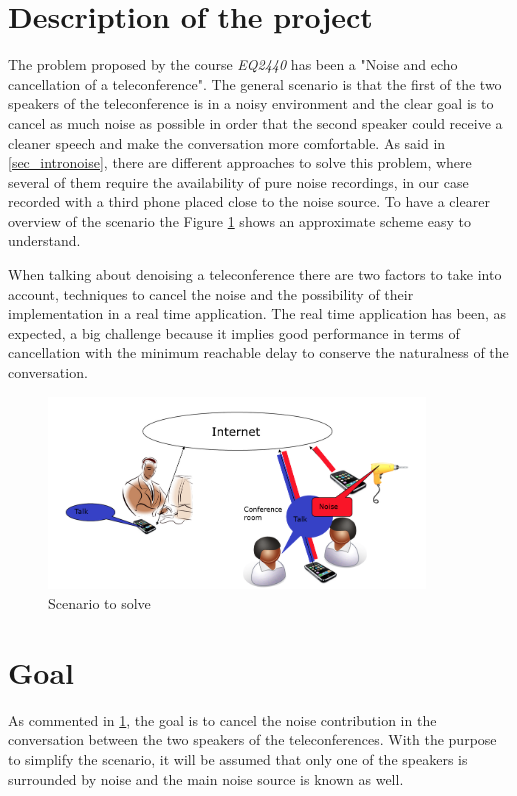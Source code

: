 \documentclass[11pt,a4paper,english]{book}  %
\theoremstyle{definition}  %
\theoremstyle{plain}  %
\theoremstyle{remark}  %
\begin{document}
	\section{Description of the project}
	\label{sec:introproblem}
	
	The problem proposed by the course \textit{EQ2440} has been a "Noise and echo cancellation of a teleconference". The general scenario is that the first of the two speakers of the teleconference is in a noisy environment and the clear goal is to cancel as much noise as possible in order that the second speaker could receive a cleaner speech and make the conversation more comfortable. As said in \ref{sec_intronoise}, there are different approaches to solve this problem, where several of them require the availability of pure noise recordings, in our case recorded with a third phone placed close to the noise source. To have a clearer overview of the scenario the Figure \ref{scenario2} shows an approximate scheme easy to understand.
	
	When talking about denoising a teleconference there are two factors to take into account, techniques to cancel the noise and the possibility of their implementation in a real time application. The real time application has been, as expected, a big challenge because it implies good performance in terms of cancellation with the minimum reachable delay to conserve the naturalness of the conversation.
	
		\begin{figure}[h]
		\centering
		\includegraphics[width=10cm]{images/other/scenario}
		\caption{Scenario to solve}
		\label{scenario2}
		\end{figure}
	
	
	
	\section{Goal}
	As commented in \ref{sec:introproblem}, the goal is to cancel the noise contribution in the conversation between the two speakers of the teleconferences. With the purpose to simplify the scenario, it will be assumed that only one of the speakers is surrounded by noise and the main noise source is known as well.
	
\end{document}
